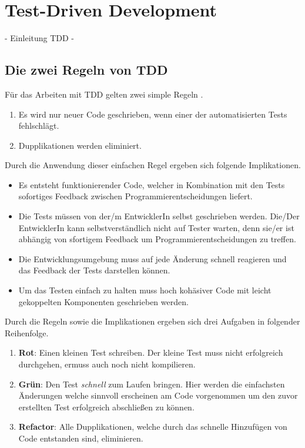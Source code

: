
\section{Test-Driven Development}
\label{section:Test-Driven Development}
 - Einleitung TDD -
\subsection{Die zwei Regeln von TDD}
Für das Arbeiten mit TDD gelten zwei simple Regeln \autocite[]{Beck:2003}.
\begin{enumerate}
  \item Es wird nur neuer Code geschrieben, wenn einer der automatisierten Tests fehlschlägt.
  \item Dupplikationen werden eliminiert.
\end{enumerate}
Durch die Anwendung dieser einfachen Regel ergeben sich folgende Implikationen.
\begin{itemize}
  \item Es entsteht funktionierender Code, welcher in Kombination mit den Tests sofortiges Feedback zwischen Programmierentscheidungen liefert.
  \item Die Tests müssen von der/m EntwicklerIn selbst geschrieben werden. Die/Der EntwicklerIn kann selbstverständlich nicht auf Tester warten, denn sie/er ist abhängig von sfortigem Feedback um Programmierentscheidungen zu treffen.
  \item Die Entwicklungsumgebung muss auf jede Änderung schnell reagieren und das Feedback der Tests darstellen können.
  \item Um das Testen einfach zu halten muss hoch kohäsiver Code mit leicht gekoppelten Komponenten geschrieben werden.
\end{itemize}
Durch die Regeln sowie die Implikationen ergeben sich drei Aufgaben in folgender Reihenfolge.
\begin{enumerate}
  \item \textbf{Rot}: Einen kleinen Test schreiben.\newline
  Der kleine Test muss nicht erfolgreich durchgehen, ermuss auch noch nicht kompilieren.
  \item \textbf{Grün}: Den Test \textit{schnell} zum Laufen bringen.\newline
  Hier werden die einfachsten Änderungen welche sinnvoll erscheinen am Code vorgenommen um den zuvor erstellten Test erfolgreich abschließen zu können.
  \item \textbf{Refactor}: Alle Dupplikationen, welche durch das schnelle Hinzufügen von Code entstanden sind, eliminieren.
\end{enumerate}
